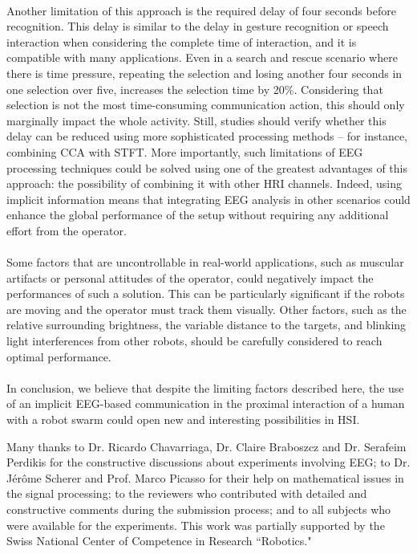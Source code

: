 \documentclass[smallextended]{svjour3}
\begin{document}
\\
Another limitation of this approach is the required delay of four seconds before recognition.
This delay is similar to the delay in gesture recognition or speech interaction when considering the complete time of interaction, and it is compatible with many applications. 
Even in a search and rescue scenario where there is time pressure, repeating the selection and losing another four seconds in one selection over five, increases the selection time by 20\%. 
Considering that selection is not the most time-consuming communication action, this should only marginally impact the whole activity. Still, studies should verify whether this delay can be reduced using more sophisticated processing methods -- for instance, combining CCA with STFT.
More importantly, such limitations of EEG processing techniques could be solved using one of the greatest advantages of this approach: the possibility of combining it with other HRI channels.
Indeed, using implicit information means that integrating EEG analysis in other scenarios could enhance the global performance of the setup without requiring any additional effort from the operator.\\
\\
Some factors that are uncontrollable in real-world applications, such as muscular artifacts or personal attitudes of the operator, could negatively impact the performances of such a solution.
This can be particularly significant if the robots are moving and the operator must track them visually. 
Other factors, such as the relative surrounding brightness, the variable distance to the targets, and blinking light interferences from other robots, should be carefully considered to reach optimal performance. \\
\\
In conclusion, we believe that despite the limiting factors described here, the use of an implicit EEG-based communication in the proximal interaction of a human with a robot swarm could open new and interesting possibilities in HSI.\\




\begin{acknowledgement}
Many thanks to Dr. Ricardo Chavarriaga, Dr. Claire Braboszcz and Dr. Serafeim Perdikis for the constructive discussions about experiments involving EEG; to Dr. J\'er\^ome Scherer and Prof. Marco Picasso for their help on mathematical issues in the signal processing; to the reviewers who contributed with detailed and constructive comments during the submission process; and to all subjects who were available for the experiments. This work was partially supported by the Swiss National Center of Competence in Research ``Robotics."
\end{acknowledgement}


\end{document}
